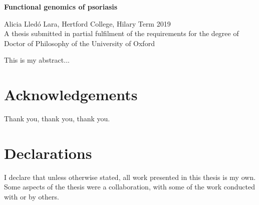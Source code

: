 \begin{center}
{{\bf Functional genomics of psoriasis}} \\
%
\end{center}
\begin{center}

{Alicia Lled\'{o} Lara, Hertford College, Hilary Term 2019}\\
{A thesis submitted in partial fulfilment of the requirements
for the degree of Doctor of Philosophy of the University of Oxford} \\
\end{center}


\noindent
This is my abstract... \\




\newpage
\chapter*{Acknowledgements}
\thispagestyle{plain}
\noindent
%
Thank you, thank you, thank you.

\newpage
\chapter*{Declarations}
\thispagestyle{plain}
\noindent
I declare that unless otherwise stated, all work presented in this thesis is my own. Some aspects of the thesis were a collaboration, with some of the work conducted with or by others.

